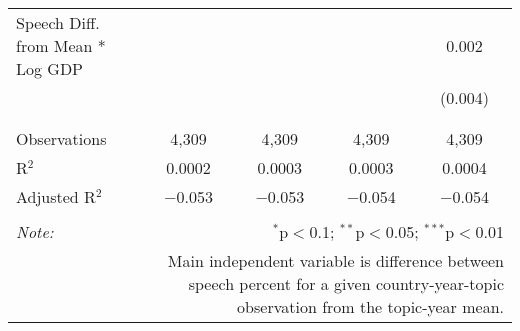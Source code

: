 \begin{table}[!htbp]
\begin{tabular}{@{\extracolsep{5pt}}lcccc}
 Speech Diff. from Mean * Log GDP &  &  &  & 0.002 \\ 
  &  &  &  & (0.004) \\ 
  & & & & \\ 
\hline \\[-1.8ex] 
Observations & 4,309 & 4,309 & 4,309 & 4,309 \\ 
R$^{2}$ & 0.0002 & 0.0003 & 0.0003 & 0.0004 \\ 
Adjusted R$^{2}$ & $-$0.053 & $-$0.053 & $-$0.054 & $-$0.054 \\ 
\hline 
\hline \\[-1.8ex] 
\textit{Note:}  & \multicolumn{4}{r}{$^{*}$p$<$0.1; $^{**}$p$<$0.05; $^{***}$p$<$0.01} \\ 
 & \multicolumn{4}{r}{Main independent variable is difference between speech percent for a given country-year-topic observation from the topic-year mean.} \\ 
\end{tabular} 
\end{table} 
